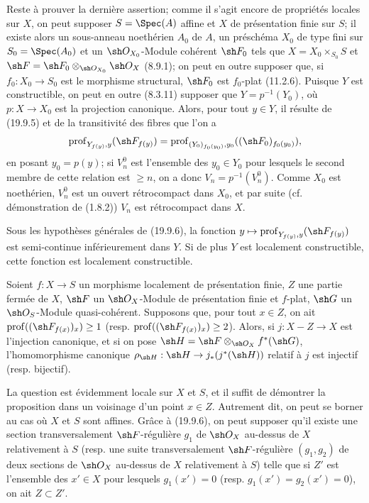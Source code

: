 Reste à prouver la dernière assertion; comme il s'agit encore de propriétés locales sur $X$, on peut supposer $S=\Spec(A)$ affine et $X$ de présentation finie sur $S$; il existe alors un sous-anneau noethérien $A_0$ de $A$, un préschéma $X_0$ de type fini sur $S_0=\Spec(A_0)$ et un $\sh O_{X_0}$-Module cohérent $\sh F_0$ tels que $X=X_0\times_{S_0}S$ et $\sh F=\sh F_0\otimes_{\sh O_{X_0}}\sh O_X$ (8.9.1); on peut en outre supposer que, si $f_0:X_0\to S_0$ est le morphisme structural, $\sh F_0$ est $f_0$-plat (11.2.6). Puisque $Y$ est constructible, on peut en outre (8.3.11) supposer que $Y=p^{-1}(Y_0)$, où $p:X\to X_0$ est la projection canonique. Alors, pour tout $y\in Y$, il résulte de (19.9.5) et de la transitivité des fibres que l'on a
\[
  \operatorname{prof}_{Y_{f(y)},y}(\sh F_{f(y)})
  =\operatorname{prof}_{(Y_0)_{f_0(y_0)},y_0}((\sh F_0)_{f_0(y_0)}),
\]
en posant $y_0=p(y)$; si $V_n^0$ est l'ensemble des $y_0\in Y_0$ pour lesquels le second membre de cette relation est $\geq n$, on a donc $V_n=p^{-1}(V_n^0)$. Comme $X_0$ est noethérien, $V_n^0$ est un ouvert rétrocompact dans $X_0$, et par suite (cf. démonstration de (1.8.2)) $V_n$ est rétrocompact dans $X$.


\begin{corollary}[19.9.7]
\label{IV.19.9.7}
Sous les hypothèses générales de (19.9.6), la fonction $y\mapsto\operatorname{prof}_{Y_{f(y)},y}(\sh F_{f(y)})$ est semi-continue inférieurement dans $Y$. Si de plus $Y$ est localement constructible, cette fonction est localement constructible.
\end{corollary}

\begin{proposition}[19.9.8]
\label{IV.19.9.8}
Soient $f:X\to S$ un morphisme localement de présentation finie, $Z$ une partie fermée de $X$, $\sh F$ un $\sh O_X$-Module de présentation finie et $f$-plat, $\sh G$ un $\sh O_S$-Module quasi-cohérent. Supposons que, pour tout $x\in Z$, on ait $\operatorname{prof}((\sh F_{f(x)})_x)\geq1$ (resp. $\operatorname{prof}((\sh F_{f(x)})_x)\geq2$). Alors, si $j:X-Z\to X$ est l'injection canonique, et si on pose $\sh H=\sh F\otimes_{\sh O_X}f^*(\sh G)$, l'homomorphisme canonique $\rho_{\sh H}:\sh H\to j_*(j^*(\sh H))$ relatif à $j$ est injectif (resp. bijectif).
\end{proposition}

La question est évidemment locale sur $X$ et $S$, et il suffit de démontrer la proposition dans un voisinage d'un point $x\in Z$. Autrement dit, on peut se borner au cas où $X$ et $S$ sont affines. Grâce à (19.9.6), on peut supposer qu'il existe une section transversalement $\sh F$-régulière $g_1$ de $\sh O_X$ au-dessus de $X$ relativement à $S$ (resp. une suite transversalement $\sh F$-régulière $(g_1,g_2)$ de deux sections de $\sh O_X$ au-dessus de $X$ relativement à $S$) telle que si $Z'$ est l'ensemble des $x'\in X$ pour lesquels $g_1(x')=0$ (resp. $g_1(x')=g_2(x')=0$), on ait $Z\subset Z'$.

